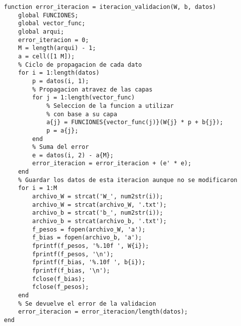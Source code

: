 \begin{lstlisting}
function error_iteracion = iteracion_validacion(W, b, datos)
    global FUNCIONES;
    global vector_func;
    global arqui;
    error_iteracion = 0;
    M = length(arqui) - 1;
    a = cell([1 M]);
    % Ciclo de propagacion de cada dato
    for i = 1:length(datos)
        p = datos(i, 1);
        % Propagacion atravez de las capas
        for j = 1:length(vector_func)
            % Seleccion de la funcion a utilizar
            % con base a su capa
            a{j} = FUNCIONES{vector_func(j)}(W{j} * p + b{j});
            p = a{j};
        end
        % Suma del error
        e = datos(i, 2) - a{M};
        error_iteracion = error_iteracion + (e' * e);
    end
    % Guardar los datos de esta iteracion aunque no se modificaron
    for i = 1:M
        archivo_W = strcat('W_', num2str(i));
        archivo_W = strcat(archivo_W, '.txt');
        archivo_b = strcat('b_', num2str(i));
        archivo_b = strcat(archivo_b, '.txt');
        f_pesos = fopen(archivo_W, 'a');
        f_bias = fopen(archivo_b, 'a');
        fprintf(f_pesos, '%.10f ', W{i});
        fprintf(f_pesos, '\n');
        fprintf(f_bias, '%.10f ', b{i});
        fprintf(f_bias, '\n');
        fclose(f_bias);
        fclose(f_pesos);
    end
    % Se devuelve el error de la validacion
    error_iteracion = error_iteracion/length(datos);
end
\end{lstlisting}